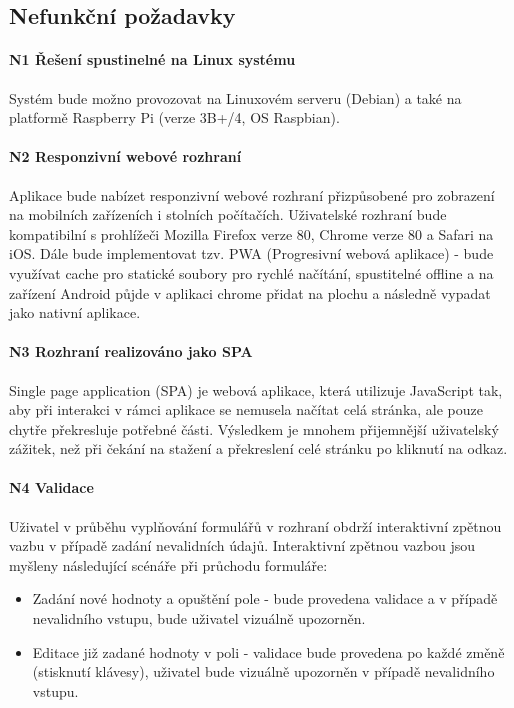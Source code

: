 \subsection{Nefunkční požadavky}

\paragraph{N1 Řešení spustinelné na Linux systému}
Systém bude možno provozovat na Linuxovém serveru (Debian) a také na platformě Raspberry Pi (verze 3B+/4, OS Raspbian).

\paragraph{N2 Responzivní webové rozhraní}
Aplikace bude nabízet responzivní webové rozhraní přizpůsobené pro zobrazení na mobilních zařízeních i stolních počítačích. Uživatelské rozhraní bude kompatibilní s prohlížeči Mozilla Firefox verze 80, Chrome verze 80 a Safari na iOS. Dále bude implementovat tzv. PWA (Progresivní webová aplikace) - bude využívat cache pro statické soubory pro rychlé načítání, spustitelné offline a na zařízení Android půjde v aplikaci chrome přidat na plochu a následně vypadat jako nativní aplikace.

\paragraph{N3 Rozhraní realizováno jako SPA}
Single page application (SPA) je webová aplikace, která utilizuje JavaScript tak, aby při interakci v rámci aplikace se nemusela načítat celá stránka, ale pouze chytře překresluje potřebné části. Výsledkem je mnohem přijemnější uživatelský zážitek, než při čekání na stažení a překreslení celé stránku po kliknutí na odkaz.

\paragraph{N4 Validace}
Uživatel v průběhu vyplňování formulářů v rozhraní obdrží interaktivní zpětnou vazbu v případě zadání nevalidních údajů. Interaktivní zpětnou vazbou jsou myšleny následující scénáře při průchodu formuláře:
\begin{itemize}
    \item Zadání nové hodnoty a opuštění pole - bude provedena validace a v případě nevalidního vstupu, bude uživatel vizuálně  upozorněn.
    \item Editace již zadané hodnoty v poli - validace bude provedena po každé změně (stisknutí klávesy), uživatel bude vizuálně upozorněn v případě nevalidního vstupu.
\end{itemize}

